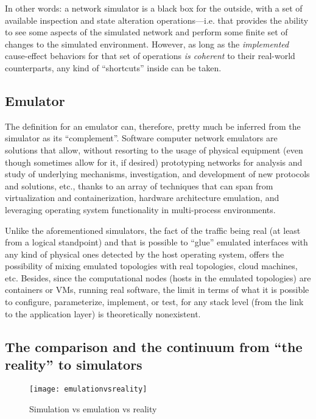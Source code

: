 In other words: a network simulator is a black box for the outside, with a set of available inspection and state alteration operations---i.e. that provides the ability to see some aspects of the simulated network and perform some finite set of changes to the simulated environment.
However, as long as the \emph{implemented} cause-effect behaviors for that set of operations \emph{is coherent} to their real-world counterparts, any kind of ``shortcuts'' inside can be taken.

\subsection{Emulator}
\label{subsec:emulator}

The definition for an emulator can, therefore, pretty much be inferred from the simulator as its ``complement''.
Software computer network emulators are solutions that allow, without resorting to the usage of physical equipment (even though sometimes allow for it, if desired) prototyping networks for analysis and study of underlying mechanisms, investigation, and development of new protocols and solutions, etc., thanks to an array of techniques that can span from virtualization and containerization, hardware architecture emulation, and leveraging operating system functionality in multi-process environments.

Unlike the aforementioned simulators, the fact of the traffic being real (at least from a logical standpoint) and that is possible to ``glue'' emulated interfaces with any kind of physical ones detected by the host operating system, offers the possibility of mixing emulated topologies with real topologies, cloud machines, etc.
Besides, since the computational nodes (hosts in the emulated topologies) are containers or VMs, running real software, the limit in terms of what it is possible to configure, parameterize, implement, or test, for any stack level (from the link to the application layer) is theoretically nonexistent.

\subsection{The comparison and the continuum from ``the reality'' to simulators}
\label{subsec:emulationversussimulation}

\begin{figure}
  \centering
  \texttt{[image: emulationvsreality]}
  \caption{Simulation vs emulation vs reality}
  \label{fig:emulationvsreality}
\end{figure}

